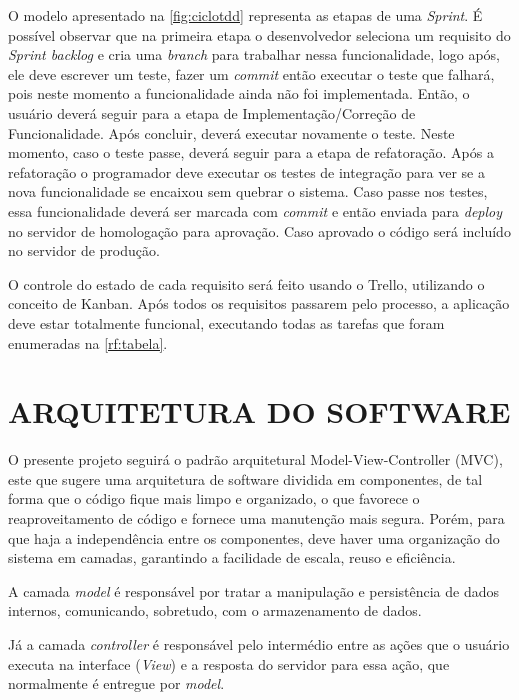 O modelo apresentado na \autoref{fig:ciclotdd} representa as etapas de uma \textit{Sprint}. É possível observar que na primeira etapa o desenvolvedor seleciona um requisito do \textit{Sprint backlog} e cria uma \textit{branch} para trabalhar nessa funcionalidade, logo após, ele deve escrever um teste, fazer um \textit{commit} então executar o teste que falhará, pois neste momento a funcionalidade ainda não foi implementada. Então, o usuário deverá seguir para a etapa de Implementação/Correção de Funcionalidade. Após concluir, deverá executar novamente o teste. Neste momento, caso o teste passe, deverá seguir para a etapa de refatoração. Após a refatoração o programador deve executar os testes de integração para ver se a nova funcionalidade se encaixou sem quebrar o sistema. Caso passe nos testes, essa funcionalidade deverá ser marcada com \textit{commit} e então enviada para \textit{deploy} no servidor de homologação para aprovação. Caso aprovado o código será incluído no servidor de produção.

O controle do estado de cada requisito será feito usando o Trello, utilizando o conceito de Kanban. Após todos os requisitos passarem pelo processo, a aplicação deve estar totalmente funcional, executando todas as tarefas que foram enumeradas na \autoref{rf:tabela}.

\clearpage

\section{ARQUITETURA DO SOFTWARE}
\label{sub:arquitetura}

O presente projeto seguirá o padrão arquitetural Model-View-Controller (MVC), este que  sugere uma arquitetura de software dividida em componentes, de tal forma que o código fique mais limpo e organizado, o que favorece o reaproveitamento de código e fornece uma manutenção mais segura. Porém, para que haja a independência entre os componentes, deve haver uma organização do sistema em camadas, garantindo a facilidade de escala, reuso e eficiência.

A camada \textit{model} é responsável por tratar a manipulação e persistência de dados internos, comunicando, sobretudo, com o armazenamento de dados.

Já a camada \textit{controller} é responsável pelo intermédio entre as ações que o usuário executa na interface (\textit{View}) e a resposta do servidor para essa ação, que normalmente é entregue por \textit{model}. 

